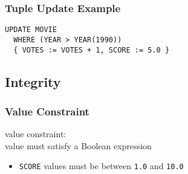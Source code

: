 \documentclass[dvipsnames]{beamer}
\theoremstyle{plain}
\begin{document}
\begin{frame}[fragile]
  \frametitle{Tuple Update Example}

  \begin{example}
    \begin{lstlisting}
UPDATE MOVIE
  WHERE (YEAR > YEAR(1990))
  { VOTES := VOTES + 1, SCORE := 5.0 }
    \end{lstlisting}
  \end{example}
\end{frame}

\subsection{Integrity}

\begin{frame}
  \frametitle{Value Constraint}

  \begin{definition}
    \alert{value constraint}:\\
      value must satisfy a Boolean expression
  \end{definition}

  \pause
  \begin{example}
    \begin{itemize}
      \item \texttt{SCORE} values must be between \texttt{1.0} and \texttt{10.0}
    \end{itemize}
  \end{example}
\end{frame}
\end{document}

